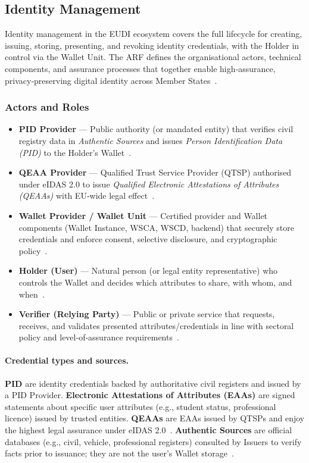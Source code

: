 \documentclass[sigconf,balance,nonacm,authordraft]{acmart}
\begin{document}
\subsection{Identity Management}

Identity management in the EUDI ecosystem covers the full lifecycle for creating, issuing, storing, presenting, and revoking identity credentials, with the Holder in control via the Wallet Unit. The ARF defines the organisational actors, technical components, and assurance processes that together enable high‑assurance, privacy‑preserving digital identity across Member States~\cite{EU_ARF2024}.

\subsubsection*{Actors and Roles}
\begin{itemize}
  \item \textbf{PID Provider} — Public authority (or mandated entity) that verifies civil registry data in \textit{Authentic Sources} and issues \textit{Person Identification Data (PID)} to the Holder's Wallet~\cite{EU_ARF2024}.
  \item \textbf{QEAA Provider} — Qualified Trust Service Provider (QTSP) authorised under eIDAS 2.0 to issue \textit{Qualified Electronic Attestations of Attributes (QEAAs)} with EU‑wide legal effect~\cite{EU_eIDAS2024}.
  \item \textbf{Wallet Provider / Wallet Unit} — Certified provider and Wallet components (Wallet Instance, WSCA, WSCD, backend) that securely store credentials and enforce consent, selective disclosure, and cryptographic policy~\cite{EU_ARF2024}.
  \item \textbf{Holder (User)} — Natural person (or legal entity representative) who controls the Wallet and decides which attributes to share, with whom, and when~\cite{EU_ARF2024}.
  \item \textbf{Verifier (Relying Party)} — Public or private service that requests, receives, and validates presented attributes/credentials in line with sectoral policy and level‑of‑assurance requirements~\cite{EU_ARF2024}.
\end{itemize}

\paragraph{Credential types and sources.}
\textbf{PID} are identity credentials backed by authoritative civil registers and issued by a PID Provider. 
\textbf{Electronic Attestations of Attributes (EAAs)} are signed statements about specific user attributes (e.g., student status, professional licence) issued by trusted entities. 
\textbf{QEAAs} are EAAs issued by QTSPs and enjoy the highest legal assurance under eIDAS 2.0~\cite{EU_eIDAS2024}. 
\textbf{Authentic Sources} are official databases (e.g., civil, vehicle, professional registers) consulted by Issuers to verify facts prior to issuance; they are not the user's Wallet storage~\cite{EU_ARF2024}.
\end{document}
